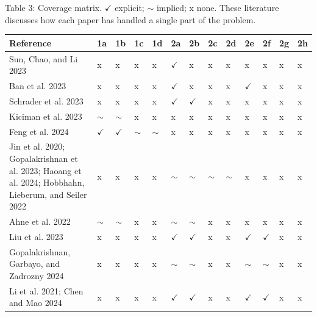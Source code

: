 \documentclass[conference]{IEEEtran}
\begin{document}
\begin{table}[t]
\footnotesize
\centering
    Table 3: {Coverage matrix. $\checkmark$ explicit; $\sim$ implied; x none. These literature discusses how each paper has handled a single part of the problem.}
\vspace{3pt} 
\begin{tabular}{|p{8.5cm}|*{12}{>{\centering\arraybackslash}p{1em}|}}
    \hline
    Reference & 1a & 1b & 1c & 1d & 2a & 2b & 2c & 2d & 2e & 2f & 2g & 2h \\
    \hline
    Sun, Chao, and Li 2023 \cite{sun2023event}                                                    & x & x & x & x & $\checkmark$ & x & x & x & x & x & x & x \\ \hline
    Ban et al. 2023 \cite{ban2023query}                                                    & x & x & x & x & $\checkmark$ & x & x & x & $\checkmark$ & x & x & x \\ \hline
    Schrader et al. 2023 \cite{schrader2023boschai}                                            & x & x & x & x & $\checkmark$ & $\checkmark$ & x & x & x & x & x & x \\ \hline
    Kiciman et al. 2023 \cite{kiciman2023causal}                                              & $\sim$ & $\sim$ & x & x & x & x & x & x & x & x & x & x \\ \hline
    Feng et al. 2024 \cite{feng2024pre}                                                    & $\checkmark$ & $\checkmark$ & $\sim$ & $\sim$ & x & x & x & x & x & x & x & x \\ \hline
    Jin et al. 2020; Gopalakrishnan et al. 2023; Haoang et al. 2024;
Hobbhahn, Lieberum, and Seiler 2022 \cite{jin2020inter,gopalakrishnan2023text,chi2024unveiling,hobbhahn2022investigating}
    & x & x & x & x & $\sim$ & $\sim$ & $\sim$ & $\sim$ & x & x & x & x \\ \hline
   Ahne et al. 2022 \cite{ahne2022extraction}                                             & $\sim$ & $\sim$ & x & x & $\sim$ & $\sim$ & x & x & x & x & x & x \\ \hline
   Liu et al. 2023 \cite{liu2023event}                                                   & x & x & x & x & $\checkmark$ & $\checkmark$ & x & x & $\checkmark$ & $\checkmark$ & x & x \\ \hline
    Gopalakrishnan, Garbayo, and Zadrozny 2024 \cite{gopalakrishnan2024causality}                                   & x & x & x & x & $\sim$ & $\sim$ & x & x & $\sim$ & $\sim$ & x & x \\ \hline
    Li et al. 2021; Chen and Mao 2024 \cite{li2021causality,chen2024explicit}                               & x & x & x & x & $\checkmark$ & $\checkmark$ & x & x & $\checkmark$ & $\checkmark$ & x & x \\ \hline

\end{tabular}
\end{table}
\end{document}
